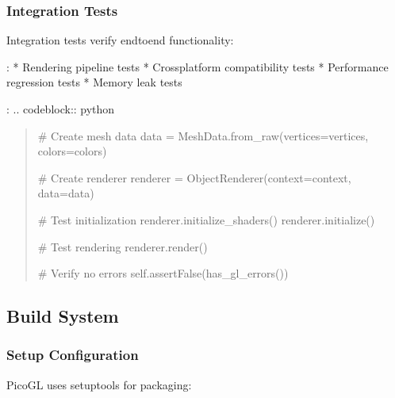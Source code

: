 \documentclass[a4paper,10pt,english,openany,oneside]{sphinxmanual}
\begin{document}
\subsubsection{Integration Tests}
\label{\detokenize{development:integration-tests}}
\sphinxAtStartPar
Integration tests verify end\sphinxhyphen{}to\sphinxhyphen{}end functionality:

\sphinxAtStartPar
{}:
* Rendering pipeline tests
* Cross\sphinxhyphen{}platform compatibility tests
* Performance regression tests
* Memory leak tests

\sphinxAtStartPar
{}:
.. code\sphinxhyphen{}block:: python
\begin{quote}
\begin{description}
\sphinxAtStartPar
\# Create mesh data
data = MeshData.from\_raw(vertices=vertices, colors=colors)

\sphinxAtStartPar
\# Create renderer
renderer = ObjectRenderer(context=context, data=data)

\sphinxAtStartPar
\# Test initialization
renderer.initialize\_shaders()
renderer.initialize()

\sphinxAtStartPar
\# Test rendering
renderer.render()

\sphinxAtStartPar
\# Verify no errors
self.assertFalse(has\_gl\_errors())

\end{description}
\end{quote}


\subsection{Build System}
\label{\detokenize{development:build-system}}

\subsubsection{Setup Configuration}
\label{\detokenize{development:setup-configuration}}
\sphinxAtStartPar
PicoGL uses setuptools for packaging:
\end{document}
